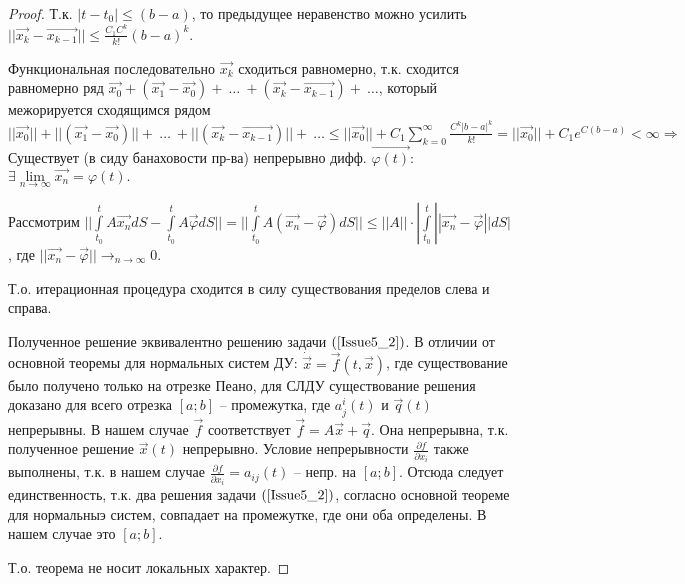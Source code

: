 \begin{proof}
Т.к. $|t-t_0| \leqslant (b-a)$, то предыдущее неравенство можно усилить $||\overrightarrow{x_k} - \overrightarrow{x_{k-1}}|| \leqslant \frac{C_1C^k}{k!}(b-a)^k.$

Функциональная последовательно $\overrightarrow{x_k}$ сходиться равномерно, т.к. сходится равномерно ряд $\overrightarrow{x_0} + (\overrightarrow{x_1} - \overrightarrow{x_0}) +\ \dots\ +(\overrightarrow{x_k} - \overrightarrow{x_{k-1}}) +\ \dots$, который межорируется сходящимся рядом $||\overrightarrow{x_0}|| + ||(\overrightarrow{x_1} - \overrightarrow{x_0})|| +\ \dots\ + ||(\overrightarrow{x_k} - \overrightarrow{x_{k-1}})|| +\ \dots \leqslant ||\overrightarrow{x_0}|| + C_1\sum\limits_{k = 0}^{\infty}\frac{C^k|b-a|^k}{k!} = ||\overrightarrow{x_0}|| + C_1 e^{C(b-a)} < \infty \Rightarrow$ Существует (в сиду банаховости пр-ва) непрерывно дифф. $\overrightarrow{\varphi(t)}:$ $\exists \lim\limits_{n \rightarrow \infty} \overrightarrow{x_n} = \varphi(t).$

Рассмотрим $|| \int\limits_{t_0}^{t} A\overrightarrow{x_n}dS - \int\limits_{t_0}^{t} A\overrightarrow{\varphi} dS || = || \int\limits_{t_0}^{t} A(\overrightarrow{x_n} - \overrightarrow{\varphi})dS || \leqslant ||A||\cdot | \int\limits_{t_0}^{t} ||\overrightarrow{x_n} - \overrightarrow{\varphi}|| dS | $, где $||\overrightarrow{x_n} - \overrightarrow{\varphi} || \rightarrow_{n\rightarrow \infty} 0.$

Т.о. итерационная процедура сходится в силу существования пределов слева и справа.

Полученное решение эквивалентно решению задачи $(\ref{Issue5_2})$. В отличии от основной теоремы для нормальных систем ДУ: $\dot{\overrightarrow{x}} = \overrightarrow{f}(t, \overrightarrow{x})$, где существование было получено только на отрезке Пеано, для СЛДУ существование решения доказано для всего отрезка $[a;b]$ -- промежутка, где $a_j^i(t)$ и $\overrightarrow{q}(t)$ непрерывны. В нашем случае $\overrightarrow{f}$ соответствует $\overrightarrow{f} = A\overrightarrow{x} + \overrightarrow{q}$. Она непрерывна, т.к. полученное решение $\overrightarrow{x}(t)$ непрерывно. Условие непрерывности $\frac{\partial f}{\partial x_i}$ также выполнены, т.к. в нашем случае $\frac{\partial f}{\partial x_i} = a_{ij}(t)$ -- непр. на $[a;b]$. Отсюда следует единственность, т.к. два решения задачи $(\ref{Issue5_2})$, согласно основной теореме для нормальныэ систем, совпадает на промежутке, где они оба определены. В нашем случае это $[a;b]$.

Т.о. теорема не носит локальных характер.

\end{proof}